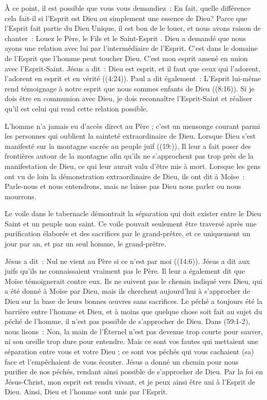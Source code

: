 À ce point, il est possible que vous vous demandiez~:
 \og En fait, quelle différence cela fait-il si l'Esprit est Dieu
 ou simplement une essence de Dieu? \fg{}
 Parce que l'Esprit fait partie du Dieu Unique, il est bon de le louer,
 et nous avons raison de chanter~:
 \og Louez le Père, le Fils et le Saint-Esprit \fg{}.
 Dieu a demandé que nous ayons une relation avec lui par l'intermédiaire
 de l'Esprit. C'est dans le domaine de l'Esprit que l'homme peut toucher Dieu.
 C'est mon esprit amené en union avec l'Esprit-Saint. Jésus a dit~:
 \og Dieu est esprit, et il faut que ceux qui l'adorent, l'adorent en esprit
 et en vérité \fg{} ((4:24)).
 Paul a dit également~: \og L'Esprit lui-même rend témoignage à notre esprit
 que nous sommes enfants de Dieu \fg{} ((8:16)).
 Si je dois être en communion avec Dieu, je dois reconnaître l'Esprit-Saint
 et réaliser qu'il est celui qui rend cette relation possible.

L'homme n'a jamais eu d'accès direct au Père ; c'est un mensonge courant parmi
 les personnes qui oublient la sainteté extraordinaire de Dieu.
 Lorsque Dieu s'est manifesté sur la montagne sacrée au peuple juif
 ((19:)), Il leur a fait poser des frontières autour de
 la montagne afin qu'ils ne s'approchent pas trop près de la manifestation
 de Dieu, ce qui leur aurait valu d'être mis à mort.
 Lorsque les gens ont vu de loin la démonstration extraordinaire de Dieu,
 ils ont dit à Moïse~:
 \og Parle-nous et nous entendrons, mais ne laisse pas Dieu nous parler
 ou nous mourrons. \fg{}

Le voile dans le tabernacle démontrait la séparation qui doit exister entre
 le Dieu Saint et un peuple non saint.
 Ce voile pouvait seulement être traversé après une purification élaborée
 et des sacrifices par le grand-prêtre, et ce uniquement un jour par an,
 et par un seul homme, le grand-prêtre.

Jésus a dit~: \og Nul ne vient au Père si ce n'est par moi \fg{}
 ((14:6)).
 Jésus a dit aux juifs qu'ils ne connaissaient vraiment pas le Père.
 Il leur a également dit que Moïse témoignerait contre eux.
 Ils ne suivent pas le chemin indiqué vers Dieu, qui a été donné
 à Moïse par Dieu, mais ils cherchent aujourd'hui à s'approcher de Dieu
 sur la base de leurs bonnes œuvres sans sacrifices.
 Le péché a toujours été la barrière entre l'homme et Dieu, et à moins
 que quelque chose soit fait au sujet du péché de l'homme,
 il n'est pas possible de s'approcher de Dieu.
 Dans (59:1-2), nous lisons~:
 \og Non, la main de l'Éternel n'est pas devenue trop courte pour sauver,
 ni son oreille trop dure pour entendre.
 Mais ce sont vos fautes qui mettaient une séparation entre vous et votre Dieu ;
 ce sont vos péchés qui vous cachaient (sa) face et l'empêchaient
 de vous écouter. \fg{}
 Jésus a donné un chemin pour nous purifier de nos péchés,
 rendant ainsi possible de s'approcher de Dieu.
 Par la foi en Jésus-Christ, mon esprit est rendu vivant, et je peux ainsi
 être uni à l'Esprit de Dieu. Ainsi, Dieu et l'homme sont unis par l'Esprit.

